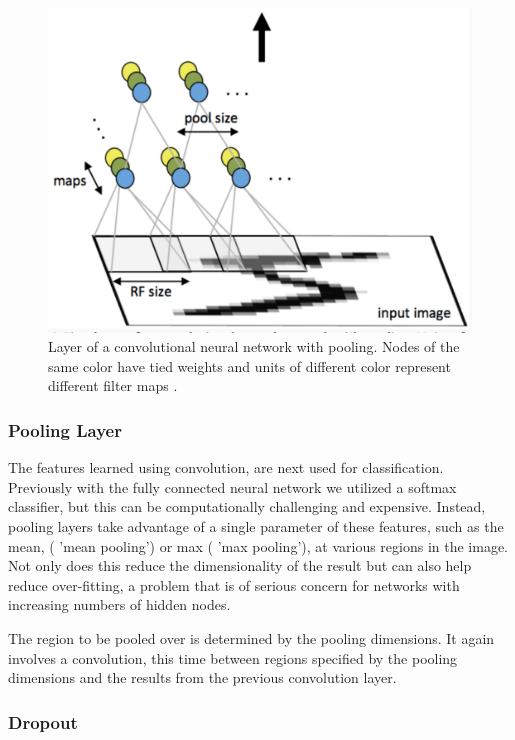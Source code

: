 \documentclass[12pt, twocolumn]{article}
\begin{document}
\begin{figure}
\includegraphics[scale=.4]{convgraphic.png}

\caption{Layer of a convolutional neural network with pooling. Nodes of the same color have tied weights and units of different color represent different filter maps \cite{StanfordTut}. }
\label{fig:conv}
\end{figure}


\subsubsection{Pooling Layer}
The features learned using convolution, are next used for classification. Previously with the fully connected neural network we utilized a softmax classifier, but this can be computationally challenging and expensive. Instead, pooling layers take advantage of a single parameter of these features, such as the mean, ( 'mean pooling') or max ( 'max pooling'), at  various regions in the image. Not only does this reduce the dimensionality of the result but can also help reduce over-fitting, a problem that is of serious concern for networks with increasing numbers of hidden nodes. 

The region to be pooled over is determined by the pooling dimensions. It again involves a convolution, this time between regions specified by the pooling dimensions and the results from the previous convolution layer. 

\subsubsection{Dropout}
\end{document}
